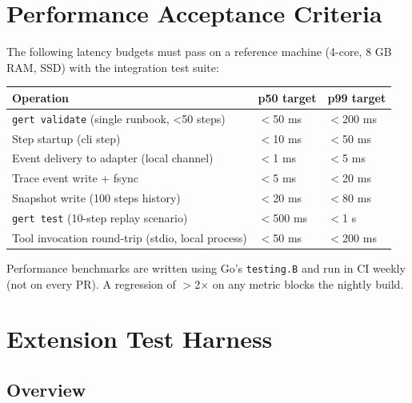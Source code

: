 \section{Performance Acceptance Criteria}

The following latency budgets must pass on a reference machine (4-core, 8 GB RAM, SSD) with the integration test suite:

\begin{center}
\begin{tabular}{lll}
\hline
\textbf{Operation} & \textbf{p50 target} & \textbf{p99 target} \\
\hline
\texttt{gert validate} (single runbook, <50 steps) & $<$50 ms   & $<$200 ms  \\
Step startup (cli step)                              & $<$10 ms   & $<$50 ms   \\
Event delivery to adapter (local channel)            & $<$1 ms    & $<$5 ms    \\
Trace event write + fsync                            & $<$5 ms    & $<$20 ms   \\
Snapshot write (100 steps history)                   & $<$20 ms   & $<$80 ms   \\
\texttt{gert test} (10-step replay scenario)         & $<$500 ms  & $<$1 s     \\
Tool invocation round-trip (stdio, local process)    & $<$50 ms   & $<$200 ms  \\
\hline
\end{tabular}
\end{center}

Performance benchmarks are written using Go's \texttt{testing.B} and run in CI weekly (not on every PR). A regression of $>$2$\times$ on any metric blocks the nightly build.

\section{Extension Test Harness}

\subsection{Overview}

